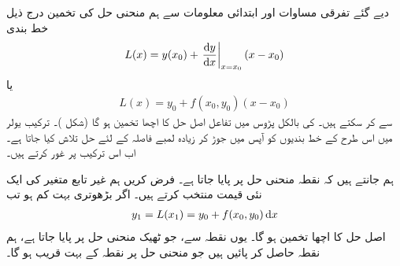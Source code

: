 دیے گئے تفرقی مساوات  اور ابتدائی معلومات  سے ہم منحنی حل  کی تخمین درج ذیل خط بندی
\begin{align*}
L(x)=y(x_0)+\left.\frac{\dif y}{\dif x}\right\vert_{x=x_0} (x-x_0)
\end{align*}
یا
\begin{align*}
L(x)=y_0+f(x_0,y_0)(x-x_0)
\end{align*}
سے  کر سکتے ہیں۔  کی بالکل پڑوس میں تفاعل  اصل حل  کا اچھا تخمین ہو گا (شکل )۔ ترکیب یولر میں اس طرح کے خط بندیوں کو آپس میں جوڑ کر زیادہ لمبے فاصلہ کے لئے حل تلاش کیا جاتا ہے۔ اب اس ترکیب پر غور کرتے ہیں۔

ہم جانتے ہیں کہ نقطہ  منحنی حل پر پایا جاتا ہے۔ فرض کریں ہم غیر تابع متغیر کی ایک نئی قیمت  منتخب کرتے ہیں۔  اگر بڑھوتری  بہت کم ہو تب
\begin{align*}
y_1=L(x_1)=y_0+f(x_0,y_0)\dif x
\end{align*}
اصل حل  کا اچھا تخمین ہو گا۔ یوں نقطہ  سے، جو ٹھیک منحنی حل پر پایا جاتا ہے، ہم نقطہ  حاصل کر پائیں ہیں جو منحنی حل پر نقطہ  کے بہت قریب ہو گا۔

